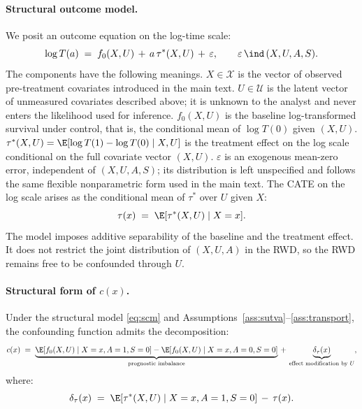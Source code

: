 \paragraph{Structural outcome model.}
We posit an outcome equation on the log-time scale:
\begin{equation}
\log T(a) \;=\; f_0(X, U) \,+\, a\,\tau^*(X, U) \,+\, \varepsilon, \qquad \varepsilon \,\ind\, (X, U, A, S).
\label{eq:scm}
\end{equation}
The components have the following meanings.
$X \in \mathcal{X}$ is the vector of observed pre-treatment covariates introduced in the main text.
$U \in \mathcal{U}$ is the latent vector of unmeasured covariates described above; it is unknown to the analyst and never enters the likelihood used for inference.
$f_0(X, U)$ is the baseline log-transformed survival under control, that is, the conditional mean of $\log T(0)$ given $(X, U)$.
$\tau^*(X, U) = \E[\log T(1) - \log T(0) \mid X, U]$ is the treatment effect on the log scale conditional on the full covariate vector $(X, U)$.
$\varepsilon$ is an exogenous mean-zero error, independent of $(X, U, A, S)$; its distribution is left unspecified and follows the same flexible nonparametric form used in the main text.
The CATE on the log scale arises as the conditional mean of $\tau^*$ over $U$ given $X$:
\begin{equation}
\tau(x) \;=\; \E[\tau^*(X, U) \mid X = x].
\label{eq:cate-marginal}
\end{equation}
The model imposes additive separability of the baseline and the treatment effect.
It does not restrict the joint distribution of $(X, U, A)$ in the RWD, so the RWD remains free to be confounded through $U$.

\paragraph{Structural form of $c(x)$.}

\begin{proposition}\label{prop:cf-structural}
Under the structural model \eqref{eq:scm} and Assumptions~\ref{ass:sutva}--\ref{ass:transport}, the confounding function admits the decomposition:
\begin{equation}
c(x) \;=\; \underbrace{\E[f_0(X, U) \mid X = x, A = 1, S = 0] - \E[f_0(X, U) \mid X = x, A = 0, S = 0]}_{\text{prognostic imbalance}} \,+\, \underbrace{\delta_\tau(x)}_{\text{effect modification by }U},
\label{eq:cf-structural}
\end{equation}
where:
\begin{equation}
\delta_\tau(x) \;=\; \E[\tau^*(X, U) \mid X = x, A = 1, S = 0] \,-\, \tau(x).
\label{eq:delta-tau}
\end{equation}
\end{proposition}

